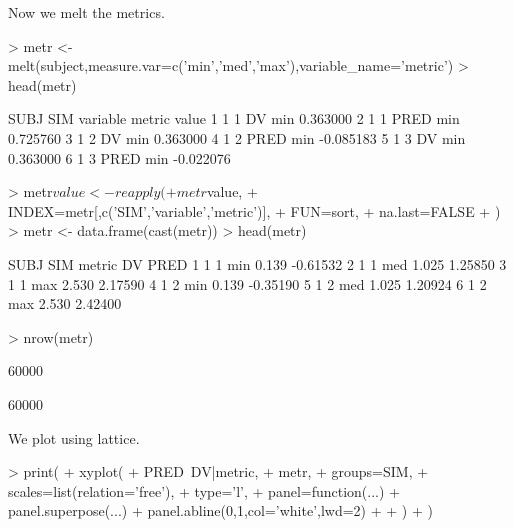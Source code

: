 Now we melt the metrics.
\begin{Schunk}
\begin{Sinput}
> metr <- melt(subject,measure.var=c('min','med','max'),variable_name='metric')
> head(metr)
\end{Sinput}
\begin{Soutput}
  SUBJ SIM variable metric     value
1    1   1       DV    min  0.363000
2    1   1     PRED    min  0.725760
3    1   2       DV    min  0.363000
4    1   2     PRED    min -0.085183
5    1   3       DV    min  0.363000
6    1   3     PRED    min -0.022076
\end{Soutput}
\begin{Sinput}
> metr$value <- reapply(
+ 	metr$value,
+ 	INDEX=metr[,c('SIM','variable','metric')],
+ 	FUN=sort,
+ 	na.last=FALSE
+ )
> metr <- data.frame(cast(metr))
> head(metr)
\end{Sinput}
\begin{Soutput}
  SUBJ SIM metric    DV     PRED
1    1   1    min 0.139 -0.61532
2    1   1    med 1.025  1.25850
3    1   1    max 2.530  2.17590
4    1   2    min 0.139 -0.35190
5    1   2    med 1.025  1.20924
6    1   2    max 2.530  2.42400
\end{Soutput}
\begin{Sinput}
> nrow(metr)
\end{Sinput}
\begin{Soutput}
[1] 60000
\end{Soutput}
\begin{Soutput}
[1] 60000
\end{Soutput}
\end{Schunk}
We plot using lattice.
\begin{Schunk}
\begin{Sinput}
> print(
+ 	xyplot(
+ 		PRED~DV|metric,
+ 		metr,
+ 		groups=SIM,
+ 		scales=list(relation='free'),
+ 		type='l',
+ 		panel=function(...){
+ 			panel.superpose(...)
+ 			panel.abline(0,1,col='white',lwd=2)
+ 		}
+ 	)
+ )
\end{Sinput}
\end{Schunk}

